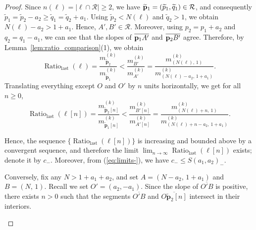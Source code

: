 \documentclass{article}
\theoremstyle{remark}
\begin{document}
\begin{proof}
 Since \( n(\ell) = |\ell \cap \mathcal R| \ge 2 \), we have \( \widetilde{\bf p}_1 = (\widetilde p_1, \widetilde q_1) \in \mathcal R \), and consequently  
\(
\widetilde p_1 = \widetilde p_2 - a_2 \geq \widetilde q_1 = \widetilde q_2 + a_1.
\)
Using \( \widetilde p_2 < N(\ell) \) and \( \widetilde q_2 > 1 \), we obtain  
\(
N(\ell) - a_2 > 1 + a_1.
\)
Hence, \( A', B' \in \mathcal R \). Moreover, using $p_2 = p_1 + a_2$ and $q_2 = q_1 - a_1$, we can see that the slopes of $\overline{{\bf p}_1 A'}$ and $\overline{{\bf p}_2 B'}$ agree. Therefore, by Lemma~\ref{lem:ratio_comparison}(1), we obtain
    \begin{equation*}
        \operatorname{Ratio}_{\mathrm{last}}(\ell)
        = \frac{m^{(k)}_{\widetilde{\mathbf{p}}_2}}{m^{(k)}_{\widetilde{\mathbf{p}}_1}}
        < \frac{m^{(k)}_{B'}}{m^{(k)}_{A'}}
        = \frac{m^{(k)}_{(N(\ell),\, 1)}}{m^{(k)}_{(N(\ell) - a_2,\, 1 + a_1)}}.
    \end{equation*}
    Translating everything except $O$ and $O'$ by $n$ units 
    horizontally, we get for all $n \geq 0$,
    \begin{equation*}
        \operatorname{Ratio}_{\mathrm{last}}(\ell[n])
        = \frac{m^{(k)}_{\widetilde{\mathbf{p}}_2[n]}}{m^{(k)}_{\widetilde{\mathbf{p}}_1[n]}}
        < \frac{m^{(k)}_{B'[n]}}{m^{(k)}_{A'[n]}}
        = \frac{m^{(k)}_{(N(\ell) + n,\, 1)}}{m^{(k)}_{(N(\ell) + n - a_2,\, 1 + a_1)}}.
    \end{equation*}

    Hence, the sequence $\{\operatorname{Ratio}_{\mathrm{last}}(\ell[n])\}$ is increasing and bounded above by a convergent sequence, and therefore the limit $\lim_{n \to \infty} \operatorname{Ratio}_{\mathrm{last}}(\ell[n])$ exists; denote it by $c_-$. 
    Moreover, from (\ref{eq:limits-}), we have $c_- \leq S(a_1, a_2)_-$.

    Conversely, fix any $N > 1+a_1+a_2$, and set $A = (N - a_2,\, 1 + a_1)$ and $B = (N,\, 1)$. 
    Recall we set $O' = (a_2,-a_1)$. Since the slope of $\overline{O'B}$ is positive, there exists $n > 0$ such that the segments $\overline{O'B}$  and $\overline{O\widetilde{\mathbf{p}}_2[n]}$ intersect in their interiors. 

\begin{center}
\end{center}


\end{proof}
\end{document}
